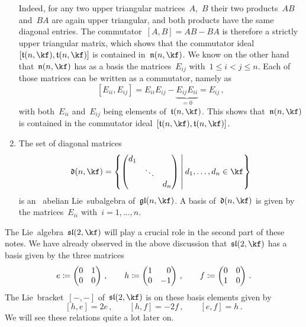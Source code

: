 \begin{examples}
\begin{enumerate}
      Indeed, for any two upper triangular matrices~$A$,~$B$ their two products~$AB$ and~$BA$ are again upper triangular, and both products have the same diagonal entries.
      The commutator~$[A,B] = AB - BA$ is therefore a strictly upper triangular matrix, which shows that the commutator ideal~$[\tlie(n, \kf), \tlie(n, \kf)]$ is contained in~$\nlie(n, \kf)$.
      We know on the other hand that~$\nlie(n, \kf)$ has as a basis the matrices~$E_{ij}$ with~$1 \leq i < j \leq n$.
      Each of those matrices can be written as a commutator, namely as
      \[
        [E_{ii}, E_{ij}]
        =
        E_{ii} E_{ij} - \underbrace{ E_{ij} E_{ii} }_{= 0}
        =
        E_{ij} \,,
      \]
      with both~$E_{ii}$ and~$E_{ij}$ being elements of~$\tlie(n, \kf)$.
      This shows that~$\nlie(n, \kf)$ is contained in the commutator ideal~$[\tlie(n, \kf), \tlie(n, \kf)]$.
    \item
      The set of diagonal matrices
      \[
        \dlie(n, \kf)
        =
        \left\{
          \begin{pmatrix}
              d_1
            & {}
            & {}
            \\
              {}
            & \ddots
            & {}
            \\
              {}
            & {}
            & d_n
          \end{pmatrix}
        \suchthat*
          d_1, \dotsc, d_n \in \kf
        \right\}
      \]
      is an~{} abelian Lie~subalgebra of~$\gllie(n, \kf)$.
      A basis of~$\dlie(n, \kf)$ is given by the matrices~$E_{ii}$ with~$i = 1, \dotsc, n$.
  \end{enumerate}
\end{examples}


\begin{remark}
  The Lie~algebra~$\sllie(2,\kf)$ will play a crucial role in the second part of these notes.
  We have already observed in the above discussion that~$\sllie(2,\kf)$ has a basis given by the three matrices
  \[
    e
    \defined
    \begin{pmatrix}
      0 & 1 \\
      0 & 0
    \end{pmatrix} \,,
    \qquad
    h
    \defined
    \begin{pmatrix*}[r]
      1 &  0  \\
      0 & -1
    \end{pmatrix*}  \,,
    \qquad
    f
    \defined
    \begin{pmatrix}
      0 & 0 \\
      1 & 0
    \end{pmatrix} \,.
  \]
  The Lie~bracket~$[-,-]$ of~$\sllie(2, \kf)$ is on these basis elements given by
  \[
    [h, e]
    =
    2e  \,,
    \qquad
    [h, f]
    =
    -2 f \,,
    \qquad
    [e,f]
    =
    h \,.
  \]
  We will see these relations quite a lot later on.
\end{remark}


